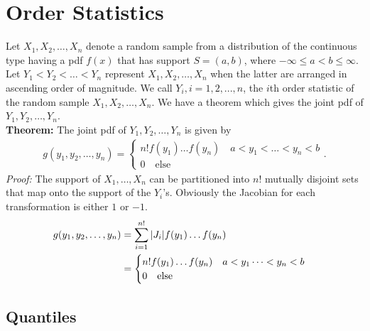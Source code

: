 \documentclass{book}
\theoremstyle{definition}
\newcommand{\nn}{\nonumber}
\newcommand{\Else}{\text{else}}
\begin{document}
\section{Order Statistics}


Let $X_1, X_2,\dots,X_n$ denote a random sample from a distribution of the continuous type having a pdf $f(x)$ that has support $S = (a, b)$, where $−\infty \leq a<b \leq \infty$. Let $Y_1 < Y_2 < \dots < Y_n$ represent $X_1, X_2,\dots,X_n$ when the latter are arranged in ascending order of magnitude. We call $Y_i, i = 1, 2,...,n$, the $i$th order statistic of the random sample $X_1, X_2,\dots,X_n$. We have a theorem which gives the joint pdf of $Y_1,Y_2,\dots,Y_n$.\\

\noindent \textbf{Theorem:} The joint pdf of $Y_1, Y_2, \dots, Y_n$ is given by
\begin{align}
g(y_1, y_2, \dots, y_n) = \begin{cases}
n!f(y_1)\dots f(y_n)\quad a < y_1 < \dots < y_n <b\\
0 \quad \Else
\end{cases}.
\end{align}
\textit{Proof:} The support of $X_1,\dots,X_n$ can be partitioned into $n!$ mutually disjoint sets that map onto the support of the $Y_i$'s. Obviously the Jacobian for each transformation is either $1$ or $-1$. 
\begin{align}
g(y_1,y_2,\dots,y_n) &= \sum^{n!}_{i=1}\abs{J_i}f(y_1)\dots f(y_n)\nn\\
&= \begin{cases}
n! f(y_1)\dots f(y_n)\quad a < y_1 \dots < y_n < b\\
0 \quad \Else
\end{cases}
\end{align}




















\subsection{Quantiles}
\end{document}
